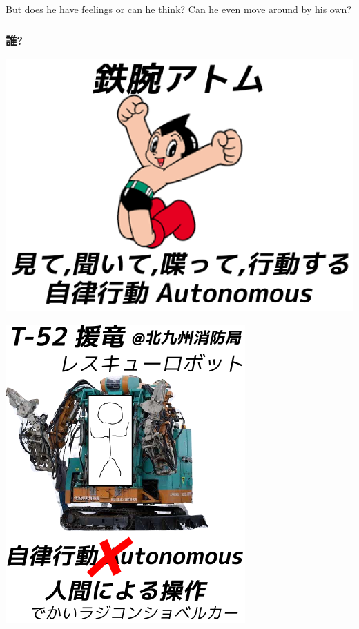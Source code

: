 \begin{resume}
But does he have feelings or can he think? Can he even move around by his own?
\end{resume}

\subsubsection{誰?}
\label{sec-4-1-5}

\begin{container-fluid}
\begin{row-fluid}
\begin{span6}
\includegraphics{img/astro/final.png}
\end{span6}
\begin{span6}
\includegraphics{img/rescue/final.png}
\end{span6}
\end{row-fluid}
\end{container-fluid}

